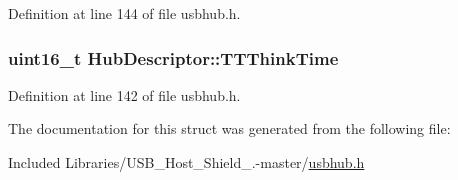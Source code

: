 \-Definition at line 144 of file usbhub.\-h.

\hypertarget{struct_hub_descriptor_a00002f5db3d923aa11645bfde3cd650e}{
\subsubsection[{\-T\-T\-Think\-Time}]{\setlength{\rightskip}{0pt plus 5cm}uint16\-\_\-t {\bf \-Hub\-Descriptor\-::\-T\-T\-Think\-Time}}}\label{struct_hub_descriptor_a00002f5db3d923aa11645bfde3cd650e}


\-Definition at line 142 of file usbhub.\-h.



\-The documentation for this struct was generated from the following file\-:\begin{DoxyCompactItemize}
\item 
\-Included Libraries/\-U\-S\-B\-\_\-\-Host\-\_\-\-Shield\-\_.-\/master/\hyperlink{usbhub_8h}{usbhub.\-h}\end{DoxyCompactItemize}
